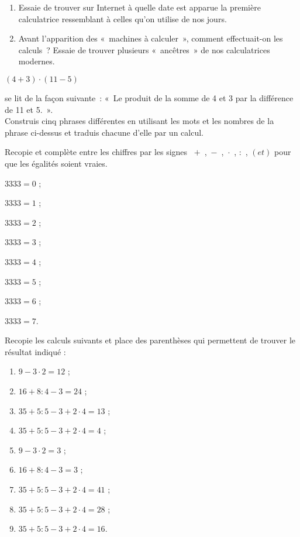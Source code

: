 \begin{exercice}
 \begin{enumerate}
  \item Essaie de trouver sur Internet à quelle date est apparue la première calculatrice ressemblant à celles qu'on utilise de nos jours.
  \item Avant l'apparition des « machines à calculer », comment effectuait-on les calculs ? Essaie de trouver plusieurs « ancêtres » de nos calculatrices modernes.
  \end{enumerate}
\end{exercice}


\begin{exercice}
\begin{center} $(4 + 3) \cdot (11 - 5)$ \end{center}
se lit de la façon suivante : « Le produit de la somme de 4 et 3 par la différence de 11 et 5. ». \\[0.75em]
Construis cinq phrases différentes en utilisant les mots et les nombres de la phrase ci-dessus et traduis chacune d’elle par un calcul.
\end{exercice}


\begin{exercice}
Recopie et complète entre les chiffres par les signes  \textcolor{B2}{$+$} , \textcolor{B2}{$-$} , \textcolor{B2}{$\cdot$} , \textcolor{B2}{$:$} , \textcolor{B2}{$( et )$} pour que les égalités soient vraies.
\begin{colenumerate}{3}
 \item $3 3 3 3 = 0$ ;
 \item $3 3 3 3 = 1$ ;
 \item $3 3 3 3 = 2$ ;
 \item $3 3 3 3 = 3$ ;
 \item $3 3 3 3 = 4$ ;
 \item $3 3 3 3 = 5$ ;
 \item $3 3 3 3 = 6$ ;
 \item $3 3 3 3 = 7$.
 \end{colenumerate}
\end{exercice}


\begin{exercice}
Recopie les calculs suivants et place des parenthèses qui permettent de trouver le résultat indiqué :
\begin{enumerate}
 \item $9 - 3 \cdot 2 = 12$ ;
 \item $16 + 8 : 4 - 3 = 24$ ;
 \item $35 + 5 : 5 - 3 + 2 \cdot 4 = 13$ ;
 \item $35 + 5 : 5 - 3 + 2 \cdot 4 = 4$ ;
 \item $9 - 3 \cdot 2 = 3$ ;
 \item $16 + 8 : 4 - 3 = 3$ ;
 \item $35 + 5 : 5 - 3 + 2 \cdot 4 = 41$ ;
 \item $35 + 5 : 5 - 3 + 2 \cdot 4 = 28$ ;
 \item $35 + 5 : 5 - 3 + 2 \cdot 4 = 16$.
 \end{enumerate}
\end{exercice}


